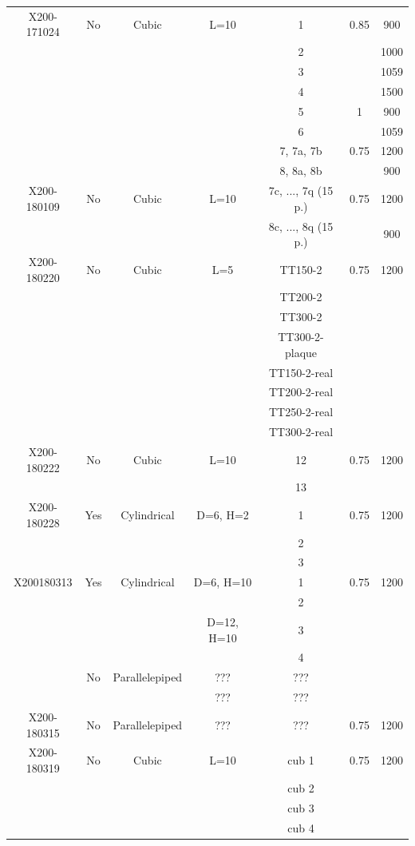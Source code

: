 \begin{center}
\begin{longtable}{@{\extracolsep{\fill}}*{7}{|c}|@{}}
  X200-171024 & No & Cubic & L=10& 1 & 0.85 & 900\\
  & &   & & 2 &  & 1000\\
  & &   & & 3&  & 1059\\
  & &  & & 4&  & 1500\\
  & &  & & 5& 1 & 900\\
  & &  & & 6&  & 1059\\
  & & & & 7, 7a, 7b & 0.75 & 1200\\
  & & & & 8, 8a, 8b& & 900\\
\hline  
  X200-180109 & No&Cubic & L=10 & 7c, ..., 7q (15 p.)& 0.75 &1200\\
  & & & & 8c, ..., 8q (15 p.)  & & 900\\
\hline  
  X200-180220 & No & Cubic & L=5 & TT150-2 & 0.75 & 1200\\
  & &  & & TT200-2 &  &\\
  & &  & & TT300-2 &  &\\
  & &  & & TT300-2-plaque &  &\\
  & &  & & TT150-2-real &  &\\
  & &  & & TT200-2-real &  &\\
  & &  & & TT250-2-real &  &\\
  & &  & & TT300-2-real &  &\\
\hline  
  X200-180222 & No & Cubic & L=10 &12& 0.75 & 1200\\
  & &  & &13 &  &\\
\hline  
  X200-180228  & Yes & Cylindrical & D=6, H=2 &1 & 0.75 & 1200\\
  & &  &  & 2&  & \\
  & &  &  & 3 &  & \\
\hline  
  X200180313 & Yes & Cylindrical & D=6, H=10&1& 0.75 & 1200\\
    & &    & &2 & &  \\
    & &  &D=12, H=10 &3& &  \\
    & & & &4 & & \\
    & No & Parallelepiped & ??? & ??? & &\\
        &  & & ??? & ??? & &\\
\hline  
  X200-180315 & No & Parallelepiped & ??? & ??? & 0.75 & 1200\\
  \hline
  X200-180319  & No & Cubic & L=10 & cub 1 & 0.75 & 1200\\
  & &  & & cub 2 & &\\
  & &  & & cub 3 & &\\
  & & & & cub 4 & &\\

\end{longtable}
\end{center}

